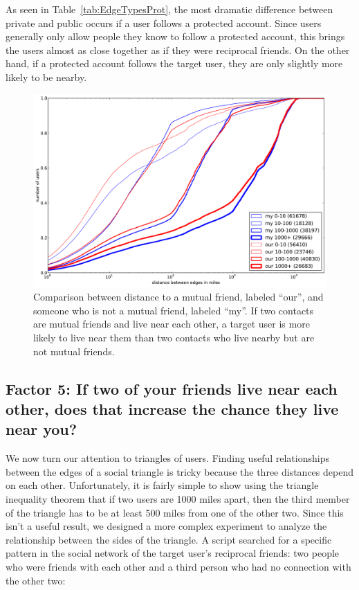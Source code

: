 \documentclass[letterpaper]{article}
\begin{document}
As seen in Table~\ref{tab:EdgeTypesProt}, the most dramatic difference between
private and public occurs if a user follows a protected account.
%
Since users generally only allow people they know to follow a protected
account, this brings the users almost as close together as if they were
reciprocal friends.
%
On the other hand, if a protected account follows the target user, they
are only slightly more likely to be nearby.

\begin{figure}[tb]
\centering
\includegraphics[width=.9\linewidth]{figures/near_triads.pdf}
\caption{
Comparison between distance to a mutual friend, labeled ``our'', and someone
who is not a mutual friend, labeled ``my''.
If two contacts are mutual friends and live near each other, a target user is
more likely to live near them than two contacts who live nearby but are not
mutual friends.
}
\label{fig:NearTriads}
\vspace{-2pt}
\end{figure}

\subsection{Factor 5: If two of your friends live near each other, does that increase the
chance they live near you?}

We now turn our attention to triangles of users.
Finding useful relationships between the edges of a social triangle is tricky
because the three distances depend on each other.
Unfortunately, it is fairly simple to show using the triangle inequality theorem
that if two users are 1000 miles apart, then the third member of the triangle
has to be at least 500 miles from one of the other two.
Since this isn't a useful result, we designed a more complex experiment to
analyze the relationship between the sides of the triangle.
A script searched for a specific pattern in the social network of
the target user's reciprocal friends: two people who were friends with each
other and a third person who had no connection with the other two:
\end{document}
